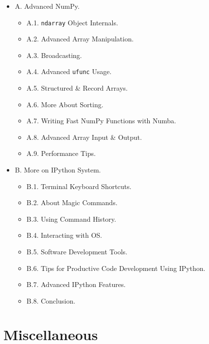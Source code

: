 \documentclass{article}
\begin{document}
\begin{enumerate}
\begin{itemize}
\begin{itemize}
		\end{itemize}
		\item {\sf A. Advanced NumPy.}
		\begin{itemize}
			\item {\sf A.1. {\tt ndarray} Object Internals.}
			\item {\sf A.2. Advanced Array Manipulation.}
			\item {\sf A.3. Broadcasting.}
			\item {\sf A.4. Advanced {\tt ufunc} Usage.}
			\item {\sf A.5. Structured \& Record Arrays.}
			\item {\sf A.6. More About Sorting.}
			\item {\sf A.7. Writing Fast NumPy Functions with Numba.}
			\item {\sf A.8. Advanced Array Input \& Output.}
			\item {\sf A.9. Performance Tips.}
		\end{itemize}
		\item {\sf B. More on IPython System.}
		\begin{itemize}
			\item {\sf B.1. Terminal Keyboard Shortcuts.}
			\item {\sf B.2. About Magic Commands.}
			\item {\sf B.3. Using Command History.}
			\item {\sf B.4. Interacting with OS.}
			\item {\sf B.5. Software Development Tools.}
			\item {\sf B.6. Tips for Productive Code Development Using IPython.}
			\item {\sf B.7. Advanced IPython Features.}
			\item {\sf B.8. Conclusion.}
		\end{itemize}
	\end{itemize}	
\end{enumerate}


\section{Miscellaneous}


\printbibliography[heading=bibintoc]
	
\end{document}
